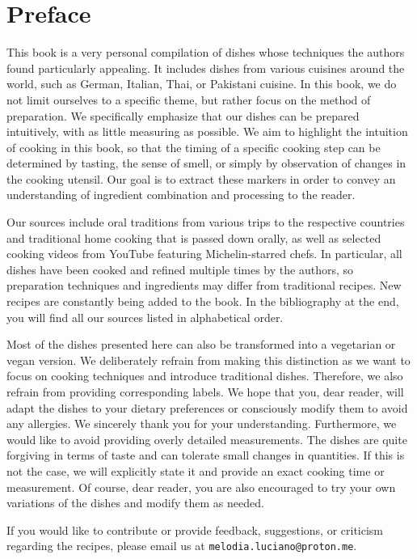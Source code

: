 \chapter*{Preface}
This book is a very personal compilation of dishes whose techniques the authors found particularly appealing. It includes dishes from various cuisines around the world, such as German, Italian, Thai, or Pakistani cuisine. In this book, we do not limit ourselves to a specific theme, but rather focus on the method of preparation. We specifically emphasize that our dishes can be prepared intuitively, with as little measuring as possible. We aim to highlight the intuition of cooking in this book, so that the timing of a specific cooking step can be determined by tasting, the sense of smell, or simply by observation of changes in the cooking utensil. Our goal is to extract these markers in order to convey an understanding of ingredient combination and processing to the reader.

Our sources include oral traditions from various trips to the respective countries and traditional home cooking that is passed down orally, as well as selected cooking videos from YouTube featuring Michelin-starred chefs. In particular, all dishes have been cooked and refined multiple times by the authors, so preparation techniques and ingredients may differ from traditional recipes. New recipes are constantly being added to the book. In the bibliography at the end, you will find all our sources listed in alphabetical order.

Most of the dishes presented here can also be transformed into a vegetarian or vegan version. We deliberately refrain from making this distinction as we want to focus on cooking techniques and introduce traditional dishes. Therefore, we also refrain from providing corresponding labels. We hope that you, dear reader, will adapt the dishes to your dietary preferences or consciously modify them to avoid any allergies. We sincerely thank you for your understanding. Furthermore, we would like to avoid providing overly detailed measurements. The dishes are quite forgiving in terms of taste and can tolerate small changes in quantities. If this is not the case, we will explicitly state it and provide an exact cooking time or measurement. Of course, dear reader, you are also encouraged to try your own variations of the dishes and modify them as needed.

If you would like to contribute or provide feedback, suggestions, or criticism regarding the recipes, please email us at \texttt{melodia.luciano@proton.me}.